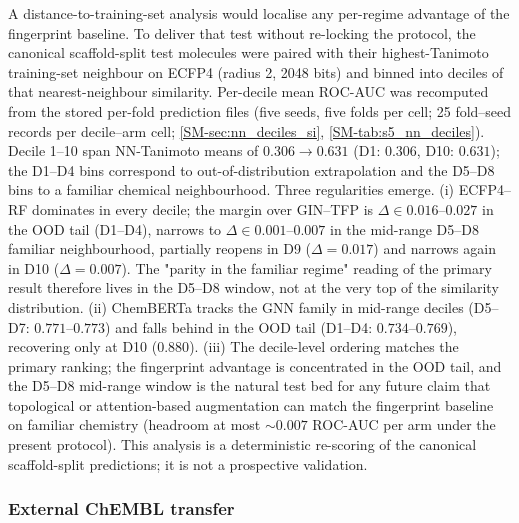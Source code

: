 \documentclass[11pt,a4paper]{article}
\begin{document}
A distance-to-training-set analysis would localise any per-regime advantage of the fingerprint baseline. To deliver that test without re-locking the protocol, the canonical scaffold-split test molecules were paired with their highest-Tanimoto training-set neighbour on ECFP4 (radius \num{2}, \num{2048} bits) and binned into deciles of that nearest-neighbour similarity. Per-decile mean ROC-AUC was recomputed from the stored per-fold prediction files (five seeds, five folds per cell; \num{25} fold--seed records per decile--arm cell; \cref{SM-sec:nn_deciles_si}, \cref{SM-tab:s5_nn_deciles}). Decile \numrange{1}{10} span NN-Tanimoto means of $\num{0.306} \to \num{0.631}$ (D\num{1}: $\num{0.306}$, D\num{10}: $\num{0.631}$); the D\num{1}--D\num{4} bins correspond to out-of-distribution extrapolation and the D\num{5}--D\num{8} bins to a familiar chemical neighbourhood. Three regularities emerge. (i) ECFP4--RF dominates in every decile; the margin over GIN--TFP is $\Delta \in \numrange{0.016}{0.027}$ in the OOD tail (D\num{1}--D\num{4}), narrows to $\Delta \in \numrange{0.001}{0.007}$ in the mid-range D\num{5}--D\num{8} familiar neighbourhood, partially reopens in D\num{9} ($\Delta = \num{+0.017}$) and narrows again in D\num{10} ($\Delta = \num{+0.007}$). The "parity in the familiar regime" reading of the primary result therefore lives in the D\num{5}--D\num{8} window, not at the very top of the similarity distribution. (ii) ChemBERTa tracks the GNN family in mid-range deciles (D\num{5}--D\num{7}: $\num{0.771}$--$\num{0.773}$) and falls behind in the OOD tail (D\num{1}--D\num{4}: $\num{0.734}$--$\num{0.769}$), recovering only at D\num{10} ($\num{0.880}$). (iii) The decile-level ordering matches the primary ranking; the fingerprint advantage is concentrated in the OOD tail, and the D\num{5}--D\num{8} mid-range window is the natural test bed for any future claim that topological or attention-based augmentation can match the fingerprint baseline on familiar chemistry (headroom at most $\sim\num{0.007}$ ROC-AUC per arm under the present protocol). This analysis is a deterministic re-scoring of the canonical scaffold-split predictions; it is not a prospective validation.

\subsubsection{External ChEMBL transfer}
\end{document}
